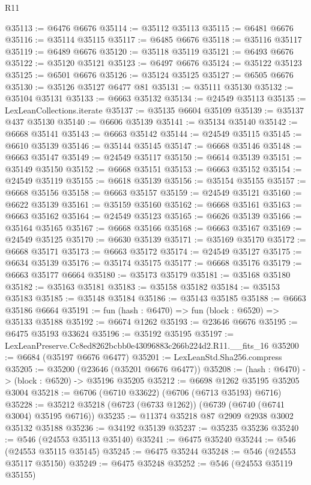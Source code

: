 \begin{lexlean}{R11}
\begin{coremodule}
@35113 := @6476 @6676
@35114 := @35112 @35113
@35115 := @6481 @6676
@35116 := @35114 @35115
@35117 := @6485 @6676
@35118 := @35116 @35117
@35119 := @6489 @6676
@35120 := @35118 @35119
@35121 := @6493 @6676
@35122 := @35120 @35121
@35123 := @6497 @6676
@35124 := @35122 @35123
@35125 := @6501 @6676
@35126 := @35124 @35125
@35127 := @6505 @6676
@35130 := @35126 @35127 @6477 @81
@35131 := @35111 @35130
@35132 := @35104 @35131
@35133 := @6663 @35132
@35134 := @24549 @35113
@35135 := LexLeanCollections.iterate
@35137 := @35135 @6604 @35109
@35139 := @35137 @437 @35130
@35140 := @6606 @35139
@35141 := @35134 @35140
@35142 := @6668 @35141
@35143 := @6663 @35142
@35144 := @24549 @35115
@35145 := @6610 @35139
@35146 := @35144 @35145
@35147 := @6668 @35146
@35148 := @6663 @35147
@35149 := @24549 @35117
@35150 := @6614 @35139
@35151 := @35149 @35150
@35152 := @6668 @35151
@35153 := @6663 @35152
@35154 := @24549 @35119
@35155 := @6618 @35139
@35156 := @35154 @35155
@35157 := @6668 @35156
@35158 := @6663 @35157
@35159 := @24549 @35121
@35160 := @6622 @35139
@35161 := @35159 @35160
@35162 := @6668 @35161
@35163 := @6663 @35162
@35164 := @24549 @35123
@35165 := @6626 @35139
@35166 := @35164 @35165
@35167 := @6668 @35166
@35168 := @6663 @35167
@35169 := @24549 @35125
@35170 := @6630 @35139
@35171 := @35169 @35170
@35172 := @6668 @35171
@35173 := @6663 @35172
@35174 := @24549 @35127
@35175 := @6634 @35139
@35176 := @35174 @35175
@35177 := @6668 @35176
@35179 := @6663 @35177 @6664
@35180 := @35173 @35179
@35181 := @35168 @35180
@35182 := @35163 @35181
@35183 := @35158 @35182
@35184 := @35153 @35183
@35185 := @35148 @35184
@35186 := @35143 @35185
@35188 := @6663 @35186 @6664
@35191 := fun (hash : @6470) => fun (block : @6520) => @35133 @35188
@35192 := @6674 @1262
@35193 := @23646 @6676
@35195 := @6475 @35193 @33624
@35196 := @35192 @35195
@35197 := LexLeanPreserve.Cc8ed8262bcbb0e43096883c266b224d2.R11.__fits_16
@35200 := @6684 (@35197 @6676 @6477)
@35201 := LexLeanStd.Sha256.compress
@35205 := @35200 (@23646 (@35201 @6676 @6477))
@35208 := (hash : @6470) -> (block : @6520) -> @35196 @35205
@35212 := @6698 @1262 @35195 @35205 @3004
@35218 := @6706 (@6710 @33622) (@6706 (@6713 @35193) @6716)
@35228 := @35212 @35218 (@6723 (@6733 @1262)) (@6739 (@6740 (@6741 @3004) @35195 @6716))
@35235 := @11374 @35218 @87 @2909 @2938 @3002 @35132 @35188
@35236 := @34192 @35139
@35237 := @35235 @35236
@35240 := @546 (@24553 @35113 @35140)
@35241 := @6475 @35240
@35244 := @546 (@24553 @35115 @35145)
@35245 := @6475 @35244
@35248 := @546 (@24553 @35117 @35150)
@35249 := @6475 @35248
@35252 := @546 (@24553 @35119 @35155)

\end{coremodule}
\end{lexlean}
